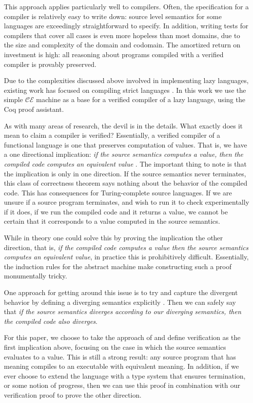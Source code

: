 This approach applies particularly well to compilers. Often, the specification
for a compiler is relatively easy to write down: source level semantics for some
languages are exceedingly straightforward to specify. In addition, writing tests 
for compilers that cover all cases is even more hopeless than most domains, due
to the size and complexity of the domain and codomain. The amortized return on
investment is high: all reasoning about programs compiled with a verified
compiler is provably preserved. 

Due to the complexities discussed above involved in implementing lazy languages,
existing work has focused on compiling strict languages
\cite{chlipala2007certified, leroy2012compcert, cakeml14}. In this work we use
the simple $\mathcal{CE}$ machine as a base for a verified compiler of a lazy
language, using the Coq proof assistant. 

As with many areas of research, the devil is in the details. What exactly does
it mean to claim a compiler is verified?  Essentially, a verified compiler of a
functional language is one that preserves computation of values. That is, we
have a one directional implication: \emph{if the source semantics computes a
value, then the compiled code computes an equivalent value}
\cite{chlipala2007certified}. The important thing to note is that the
implication is only in one direction. If the source semantics never terminates,
this class of correctness theorem says nothing about the behavior of the
compiled code. This has consequences for Turing-complete source languages. If we
are unsure if a source program terminates, and wish to run it to check
experimentally if it does, if we run the compiled code and it returns a value,
we cannot be certain that it corresponds to a value computed in the source
semantics. 

While in theory one could solve this by proving the implication the other
direction, that is, \emph{if the compiled code computes a value then the source
semantics computes an equivalent value}, in practice this is prohibitively
difficult. Essentially, the induction rules for the abstract machine make
constructing such a proof monumentally tricky. 

One approach for getting around this issue is to try and capture the divergent
behavior by defining a diverging semantics explicitly \cite{functionalbigstep}.
Then we can safely say that \emph{if the source semantics diverges according to
our diverging semantics, then the compiled code also diverges}. 

For this paper, we choose to take the approach of \cite{chlipala2007certified}
and define verification as the first implication above, focusing on the case in
which the source semantics evaluates to a value. This is still a strong
result: any source program that has meaning compiles to an executable with
equivalent meaning. In addition, if we ever choose to extend the language with a
type system that ensures termination, or some notion of progress, then we can
use this proof in combination with our verification proof to prove the other
direction. 
